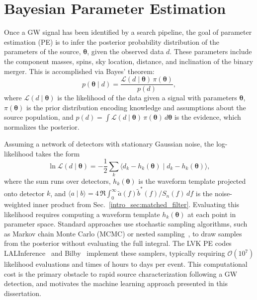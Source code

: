 \section{Bayesian Parameter Estimation}
\label{intro_sec:bayesian_pe}

Once a GW signal has been identified by a search pipeline, the goal of parameter estimation (PE) is to infer the posterior probability distribution of the parameters of the source, $\boldsymbol{\theta}$, given the observed data $d$.
These parameters include the component masses, spins, sky location, distance, and inclination of the binary merger.
This is accomplished via Bayes' theorem:
\begin{equation}
    p(\boldsymbol{\theta} \mid d) = \frac{\mathcal{L}(d \mid \boldsymbol{\theta})\, \pi(\boldsymbol{\theta})}{p(d)},
\end{equation}
where $\mathcal{L}(d \mid \boldsymbol{\theta})$ is the likelihood of the data given a signal with parameters $\boldsymbol{\theta}$, $\pi(\boldsymbol{\theta})$ is the prior distribution encoding knowledge and assumptions about the source population, and $p(d) = \int \mathcal{L}(d \mid \boldsymbol{\theta})\, \pi(\boldsymbol{\theta})\, d\boldsymbol{\theta}$ is the evidence, which normalizes the posterior.

Assuming a network of detectors with stationary Gaussian noise, the log-likelihood takes the form
\begin{equation}
    \ln \mathcal{L}(d \mid \boldsymbol{\theta}) = -\frac{1}{2} \sum_k \langle d_k - h_k(\boldsymbol{\theta}) \mid d_k - h_k(\boldsymbol{\theta}) \rangle,
\end{equation}
where the sum runs over detectors, $h_k(\boldsymbol{\theta})$ is the waveform template projected onto detector $k$, and $\langle a \mid b \rangle = 4\, \Re \int_0^\infty \tilde{a}(f)\tilde{b}^*(f) / S_n(f)\, df$ is the noise-weighted inner product from Sec.~\ref{intro_sec:matched_filter}.
Evaluating this likelihood requires computing a waveform template $h_k(\boldsymbol{\theta})$ at each point in parameter space.
Standard approaches use stochastic sampling algorithms, such as Markov chain Monte Carlo (MCMC) or nested sampling~\cite{Skilling_2006}, to draw samples from the posterior without evaluating the full integral.
The LVK PE codes LALInference~\cite{Veitch_2015} and Bilby~\cite{Ashton_2019} implement these samplers, typically requiring $\mathcal{O}(10^7)$ likelihood evaluations and times of hours to days per event.
This computational cost is the primary obstacle to rapid source characterization following a GW detection, and motivates the machine learning approach presented in this dissertation.

